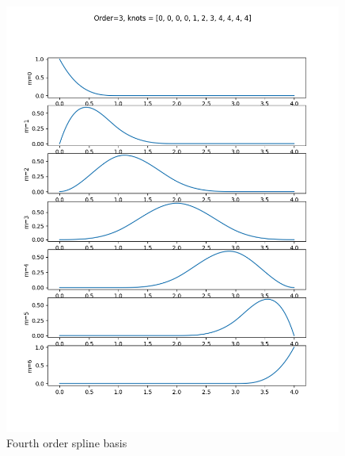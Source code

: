 \begin{figure}[hbt]
  \centering\includegraphics[width=0.99\textwidth]{./chap5_trajectory_planning/figures/spline_basis_3}
  \caption{Fourth order spline basis}
  \label{fig:spline_basis_3}  
\end{figure}

